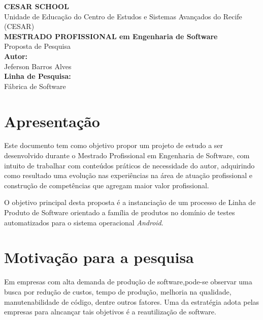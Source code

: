 \documentclass[12pt,a4paper]{article}
\begin{document}
\begin{titlepage}
\begin{flushright}
{\bf CESAR SCHOOL}\\
{Unidade de Educação do Centro de Estudos e Sistemas Avançados do Recife}
{(CESAR)}\\[3.5cm]
{\bf \large MESTRADO PROFISSIONAL em Engenharia de Software}\\
{Proposta de Pesquisa}\\[2.5cm] 
{\bf Autor:}\\
{Jeferson Barros Alves}\\[0.8cm]
{\bf Linha de Pesquisa:}\\
{Fábrica de Software}\\[0.8cm]
\end{flushright}
\end{titlepage}
\renewcommand{\cftsecleader}{\cftdotfill{\cftdotsep}} %
\tableofcontents
{}
\newpage

\section{Apresentação}
Este documento tem como objetivo propor um projeto de estudo a ser desenvolvido durante o Mestrado Profissional em Engenharia de Software, com intuito de trabalhar com conteúdos práticos de necessidade do autor, adquirindo como resultado uma evolução nas experiências na área de atuação profissional e construção de competências que agregam maior valor profissional.

O objetivo principal desta proposta é a instanciação de um processo de Linha de Produto de Software orientado a família de produtos no domínio de testes automatizados para o sistema operacional \textit{Android}.

\section{Motivação para a pesquisa}
Em empresas com alta demanda de produção de software,pode-se observar uma busca por redução de custos, tempo de produção, melhoria na qualidade, manutenabilidade de código, dentre outros fatores. Uma da estratégia adota pelas empresas para alncançar tais objetivos é a reautilização de software.
\end{document}
